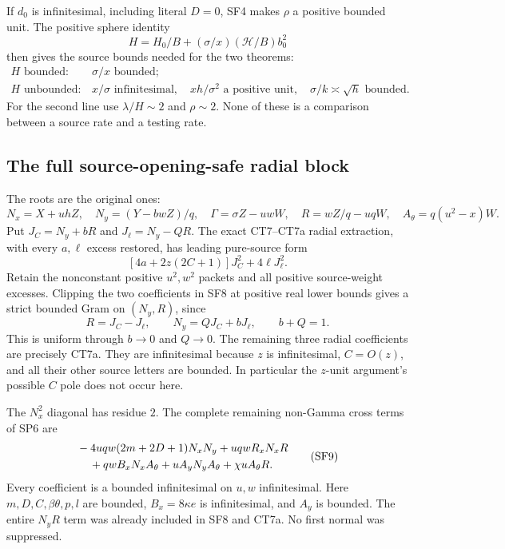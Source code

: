 If $d_0$ is infinitesimal, including literal $D=0$, SF4 makes
$\rho$ a positive bounded unit. The positive sphere identity
\[
 H=H_0/B+(\sigma/x)(\mathcal H/B)b_0^2
 \tag{SF6}
\]
then gives the source bounds needed for the two theorems:
\[
 \begin{array}{ll}
 H\text{ bounded}:&\sigma/x\text{ bounded};\\
 H\text{ unbounded}:&x/\sigma\text{ infinitesimal},\quad
                    xh/\sigma^2\text{ a positive unit},\quad
                    \sigma/k\asymp\sqrt h\text{ bounded}.
 \end{array}
 \tag{SF7}
\]
For the second line use $\lambda/H\sim2$ and $\rho\sim2$.
None of these is a comparison between a source rate and a testing rate.

\subsection{The full source-opening-safe radial block}

The roots are the original ones:
\[
 N_x=X+uhZ,\quad N_y=(Y-bwZ)/q,\quad
 \Gamma=\sigma Z-uwW,\quad R=wZ/q-uqW,\quad
 A_\theta=q(u^2-x)W.
\]
Put $J_C=N_y+bR$ and $J_\ell=N_y-QR$. The exact CT7--CT7a
radial extraction, with every $a,\ell$ excess restored, has leading
pure-source form
\[
 [4a+2z(2C+1)]J_C^2+4\ell J_\ell^2.
 \tag{SF8}
\]
Retain the nonconstant positive $u^2,w^2$ packets and all positive
source-weight excesses. Clipping the two coefficients in SF8 at
positive real lower bounds gives a strict bounded Gram on $(N_y,R)$,
since
\[
 R=J_C-J_\ell,\qquad N_y=QJ_C+bJ_\ell,
 \qquad b+Q=1.
\]
This is uniform through $b\to0$ and $Q\to0$. The remaining three
radial coefficients are precisely CT7a. They are infinitesimal
because $z$ is infinitesimal, $C=O(z)$, and all their other source
letters are bounded. In particular the $z$-unit argument's possible
$C$ pole does not occur here.

The $N_x^2$ diagonal has residue $2$. The complete remaining
non-Gamma cross terms of SP6 are
\[
 \begin{split}
 &-4uqw(2m+2D+1)N_xN_y+uqwR_xN_xR\\
 &\hspace{4mm}+qwB_xN_xA_\theta+uA_yN_yA_\theta
                         +\chi uA_\theta R.
 \end{split}
 \tag{SF9}
\]
Every coefficient is a bounded infinitesimal on $u,w$ infinitesimal.
Here $m,D,C,\beta\theta,p,l$ are bounded, $B_x=8\kappa e$ is
infinitesimal, and $A_y$ is bounded. The entire $N_yR$ term was
already included in SF8 and CT7a. No first normal was suppressed.

